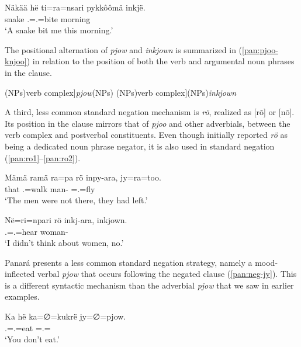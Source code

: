 \documentclass[output=paper,colorlinks,citecolor=brown,draft]{langscibook}
\begin{document}
\ea\label{pan:postv-adv}
    \gll  Näkää hë ti=ra=nsari {pykkôômä} inkjë.\\
    snake \Erg{} \Tsg.\Erg{}=\Fsg.\Abs{}=bite morning \Fsg{}\\
    \glt `A snake bit me this morning.' \\
\z

The positional alternation of \textit{pjow} and \textit{inkjown} is summarized in (\ref{pan:pjoo-knjoo}) in relation to the position of both the verb and argumental noun phrases in the clause.

\ea\label{pan:pjoo-knjoo}
    \ea (NPs)\phantom{mint}{[}verb complex{]}\phantom{mint}\textit{pjow}\phantom{mint}(NPs)
    \ex (NPs)\phantom{mint}{[}verb complex{]}\phantom{mint}(NPs)\phantom{min}\textit{inkjown}
\z\z

A third, less common standard negation mechanism is \textit{rö}, realized as [rõ] or [nõ]. Its position in the clause mirrors that of \textit{pjoo} and other adverbials, between the verb complex and postverbal constituents. Even though \citet{Dourado2007} initially reported \textit{rö} as being a dedicated noun phrase negator, it is also used in standard negation (\ref{pan:ro1}--\ref{pan:ro2}).

\ea\label{pan:ro1}
    \gll Mämä ramä ra=pa rö inpy-ara, jy=ra=too. \\
    that \Ine{} \Tpl.\Abs{}=walk \Neg{} man-\Pl{} \Intr{}=\Tpl.\Abs{}=fly \\
    \glt `The men were not there, they had left.' \\
\z

\ea\label{pan:ro2}
    \gll Në=ri=npari rö inkj-ara, inkjown. \\
    \Fsg.\Erg{}=\Tpl.\Abs{}=hear \Neg{} woman-\Pl{} \Neg{} \\
    \glt `I didn't think about women, no.' \\
\z

Panará presents a less common standard negation strategy, namely a mood-inflected verbal \textit{pjow} that occurs following the negated clause (\ref{pan:neg-jy}). This is a different syntactic mechanism than the adverbial \textit{pjow} that we saw in earlier examples.

\ea\label{pan:neg-jy}
    \gll \ob Ka hë ka=∅=kukrë \cb{} jy=∅=pjow. \\
    \db  \Ssg{} \Erg{} \Ssg.\Erg{}=\Tsg.\Abs{}=eat \db{} \Intr{}=\Tsg.\Abs{}=\Neg{} \\
    \glt `You don't eat.' \\
\z 
\end{document}
